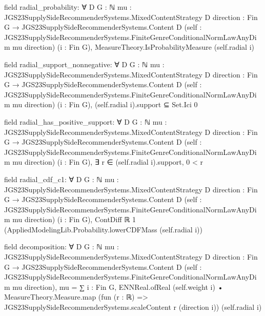 \documentclass[10pt]{article}
\begin{document}
\begin{ReviewVerbatim}
field radial_probability:
∀ {D G : ℕ} {mu : JGS23SupplySideRecommenderSystems.MixedContentStrategy D}
  {direction : Fin G → JGS23SupplySideRecommenderSystems.Content D}
  (self : JGS23SupplySideRecommenderSystems.FiniteGenreConditionalNormLawAnyDim mu direction) (i : Fin G),
  MeasureTheory.IsProbabilityMeasure (self.radial i)

field radial_support_nonnegative:
∀ {D G : ℕ} {mu : JGS23SupplySideRecommenderSystems.MixedContentStrategy D}
  {direction : Fin G → JGS23SupplySideRecommenderSystems.Content D}
  (self : JGS23SupplySideRecommenderSystems.FiniteGenreConditionalNormLawAnyDim mu direction) (i : Fin G),
  (self.radial i).support ⊆ Set.Ici 0

field radial_has_positive_support:
∀ {D G : ℕ} {mu : JGS23SupplySideRecommenderSystems.MixedContentStrategy D}
  {direction : Fin G → JGS23SupplySideRecommenderSystems.Content D}
  (self : JGS23SupplySideRecommenderSystems.FiniteGenreConditionalNormLawAnyDim mu direction) (i : Fin G),
  ∃ r ∈ (self.radial i).support, 0 < r

field radial_cdf_c1:
∀ {D G : ℕ} {mu : JGS23SupplySideRecommenderSystems.MixedContentStrategy D}
  {direction : Fin G → JGS23SupplySideRecommenderSystems.Content D}
  (self : JGS23SupplySideRecommenderSystems.FiniteGenreConditionalNormLawAnyDim mu direction) (i : Fin G),
  ContDiff ℝ 1 (AppliedModelingLib.Probability.lowerCDFMass (self.radial i))

field decomposition:
∀ {D G : ℕ} {mu : JGS23SupplySideRecommenderSystems.MixedContentStrategy D}
  {direction : Fin G → JGS23SupplySideRecommenderSystems.Content D}
  (self : JGS23SupplySideRecommenderSystems.FiniteGenreConditionalNormLawAnyDim mu direction),
  mu =
    ∑ i : Fin G,
      ENNReal.ofReal (self.weight i) •
        MeasureTheory.Measure.map (fun (r : ℝ) => JGS23SupplySideRecommenderSystems.scaleContent r (direction i))
          (self.radial i)
\end{ReviewVerbatim}
\end{document}

